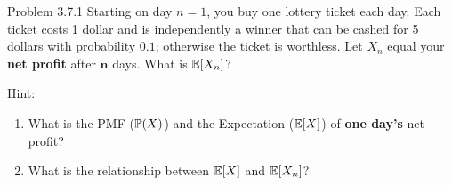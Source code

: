 \begin{problem}{Problem 3.7.1}
    Starting on day $n=1$, you buy one lottery ticket each day. Each ticket costs 1 dollar and is independently a winner that can be cashed for 5 dollars with probability $0.1$; otherwise the ticket is worthless. Let $X_n$ equal your \textbf{net profit} after $\mathbf{n}$ days. What is $\E{X_n}$?

    Hint:
    \begin{enumerate}
        \item What is the PMF ($\P{X}$) and the Expectation ($\E{X}$) of \textbf{one day's} net profit?
        \item What is the relationship between $\E{X}$ and $\E{X_n}$?
    \end{enumerate}
\end{problem}